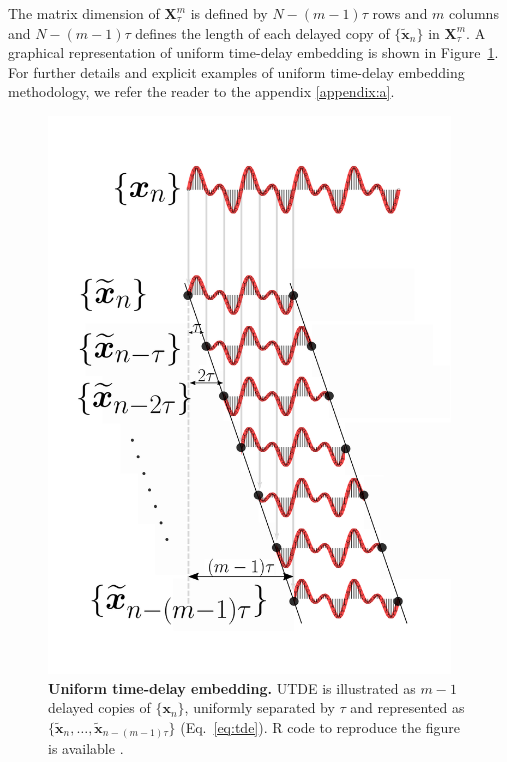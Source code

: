 The matrix dimension of $ \boldsymbol{X}_{\tau}^{m} $ is defined by
$N-(m-1)\tau$ rows and $m$ columns and $N-(m-1)\tau$ defines the length of 
each delayed copy 
of $\{ \boldsymbol{ \tilde{x} }_n \}$ in $\boldsymbol{X}^{m}_{\tau}$.
A graphical representation of uniform time-delay embedding is shown in 
Figure~\ref{fig:utde}. For further details and explicit examples of uniform 
time-delay embedding methodology, we refer the reader to the appendix 
\ref{appendix:a}.
\begin{figure}
 \centering
   \includegraphics[width=0.95\textwidth]{utde}
   \caption{
	{\bf Uniform time-delay embedding.} 
	UTDE is illustrated as $m-1$ delayed copies
   	of $\{ \boldsymbol{x}_n \}$, uniformly separated by $\tau$ and 
	represented as
	$\{ \boldsymbol{ \tilde{x} }_n, \dots,  
	\boldsymbol{ \tilde{x} }_{n -(m-1)\tau}   \}$ (Eq.~\ref{eq:tde}).
	R code to reproduce the figure is available \cite{hwum2018}.
   }
   \label{fig:utde}
\end{figure}



